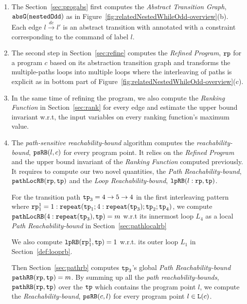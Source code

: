 \begin{enumerate}
    \item  The Section~\ref{sec:progabs} first 
    computes the \emph{Abstract Transition Graph}, $\mathtt{abs}{\mathtt{G}}(\mathtt{nestedOdd})$ as in Figure~\ref{fig:relatedNestedWhileOdd-overview}(b).
    Each edge $l \xrightarrow{dc} l'$ is an abstract transition with annotated with a constraint corresponding to the command of label $l$.
    \item The second step in Section~\ref{sec:refine}
    computes the \emph{Refined Program}, $\mathtt{rp}$ for a program $c$ based on 
    its abstraction transition graph and transforms the multiple-paths loops
    into multiple loops where
    the interleaving of paths is explicit as in bottom part of Figure~\ref{fig:relatedNestedWhileOdd-overview}(c).
    \item In the same time of refining the program, we also compute the \emph{Ranking Function} in Section~\ref{sec:rank}
    for every edge 
    and estimate the upper bound invariant w.r.t, the input variables on every ranking function's maximum value.
    \item The \emph{path-sensitive reachability-bound} algorithm computes the \emph{reachability-bound}, $\mathtt{psRB}(l, c)$ for every program point.
    It relies on the \emph{Refined Program} and the upper bound invariant of the \emph{Ranking Function} computed previously.
    It requires to compute our two novel quantities, the \emph{Path Reachability-bound}, $\mathtt{pathLocRB}(\mathtt{rp}, \mathtt{tp})$ and the \emph{Loop Reachability-bound}, $\mathtt{lpRB}(l: \mathtt{rp}, \mathtt{tp})$.

    For the transition path $\mathtt{tp}_3 = 4 \to 5 \to 4$ in the first interleaving pattern where $\mathtt{rp}_1^1 = 1: \mathtt{repeat}(\mathtt{tp}_1; 4:\mathtt{repeat}(\mathtt{tp}_3); \mathtt{tp}_2; \mathtt{tp}_4)$,
    we compute $\mathtt{pathLocRB}(4:\mathtt{repeat}(\mathtt{tp}_3), \mathtt{tp}) = m$ w.r.t its innermost loop $L_4$ as a local \emph{Path Reachability-bound} in Section~\ref{sec:pathlocalrb}
    
    We also compute $\mathtt{lpRB}(\mathtt{rp}_1^1, \mathtt{tp}) = 1$ w.r.t. its outer loop $L_1$ in Section~\ref{def:looprb}.

    Then Section~\ref{sec:pathrb} computes $\mathtt{tp}_3$'s global \emph{Path Reachability-bound} $\mathtt{pathRB}(\mathtt{rp}, \mathtt{tp}) = m$.
    By summing up all the \emph{path reachability-bounds}, $\mathtt{pathRB}(\mathtt{rp}, \mathtt{tp})$ over the $\mathtt{tp}$ which contains the program point $l$, we compute the \emph{Reachability-bound}, $\mathtt{psRB}(c, l)$ for every program point $l \in \mathtt{L}(c)$.
    

\end{enumerate}
